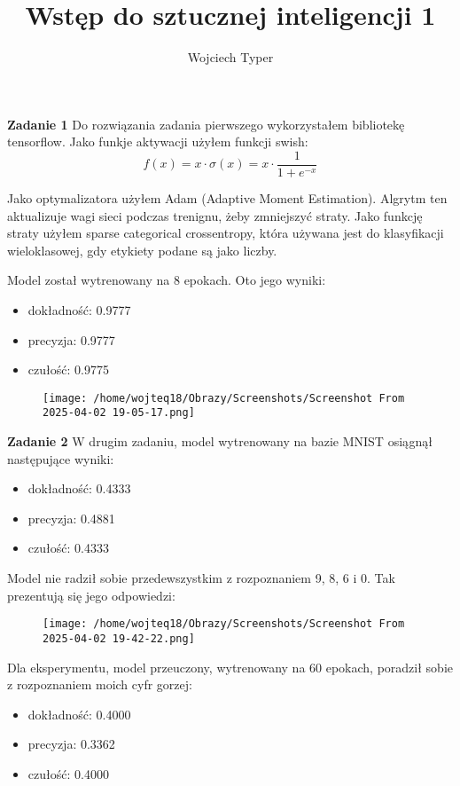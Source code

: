\documentclass{article}
\title{Wstęp do sztucznej inteligencji 1}
\author{Wojciech Typer}
\date{}
\begin{document}
\maketitle
\textbf{Zadanie 1} \newline
Do rozwiązania zadania pierwszego wykorzystałem bibliotekę tensorflow. Jako funkje aktywacji 
użyłem funkcji swish: 
\[
f(x) = x \cdot \sigma(x) = x \cdot \frac{1}{1 + e^{-x}} 
\] 

Jako optymalizatora użyłem Adam (Adaptive Moment Estimation). Algrytm ten aktualizuje wagi sieci podczas trenignu,
żeby zmniejszyć straty. \newline
Jako funkcję straty użyłem sparse categorical crossentropy, która używana jest do klasyfikacji
wieloklasowej, gdy etykiety podane są jako liczby. \newline

Model został wytrenowany na 8 epokach. Oto jego wyniki: \newline
\begin{itemize}
    \item dokładność: 0.9777
    \item precyzja: 0.9777
    \item czułość: 0.9775
\end{itemize}
\begin{figure}[H]
    \centering
    \texttt{[image: /home/wojteq18/Obrazy/Screenshots/Screenshot From 2025-04-02 19-05-17.png]}
    \label{fig:example_image}
\end{figure} 
\textbf{Zadanie 2} \newline
W drugim zadaniu, model wytrenowany na bazie MNIST osiągnął następujące wyniki: \newline
\begin{itemize}
    \item dokładność: 0.4333
    \item precyzja: 0.4881
    \item czułość: 0.4333
\end{itemize} 
Model nie radził sobie przedewszystkim z rozpoznaniem 9, 8, 6 i 0. Tak prezentują się jego odpowiedzi:
\begin{figure}[H]
    \centering
    \texttt{[image: /home/wojteq18/Obrazy/Screenshots/Screenshot From 2025-04-02 19-42-22.png]}
    \label{fig:example_image}
\end{figure}  
\vspace{5\baselineskip}
Dla eksperymentu, model przeuczony, wytrenowany na 60 epokach, poradził sobie z rozpoznaniem moich cyfr gorzej: 
\begin{itemize}
    \item dokładność: 0.4000
    \item precyzja: 0.3362
    \item czułość: 0.4000
\end{itemize}
\end{document}
